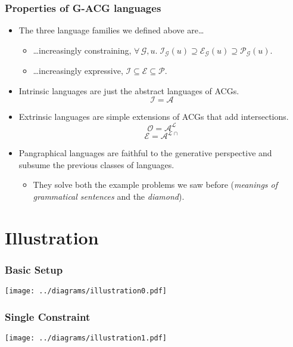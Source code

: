 \documentclass{beamer}
\begin{document}
\begin{frame}
  \frametitle{Properties of G-ACG languages}

  \begin{itemize}
  \item The three language families we defined above are\ldots
    \begin{itemize}
    \item {\ldots}increasingly constraining, $\forall \, \mathcal{G},
      u. \; \mathcal{I}_{\mathcal{G}}(u) \supseteq
      \mathcal{E}_{\mathcal{G}}(u) \supseteq
      \mathcal{P}_{\mathcal{G}}(u)$.
    \item {\ldots}increasingly expressive, $\mathcal{I} \subseteq
      \mathcal{E} \subseteq \mathcal{P}$.
    \end{itemize}
  \vfill
  \item Intrinsic languages are just the abstract languages of ACGs.
    $$\mathcal{I} = \mathcal{A}$$
  \item Extrinsic languages are simple extensions of ACGs that add
    intersections.
    $$\mathcal{O} = \mathcal{A}^{\mathcal{L}}$$
    $$\mathcal{E} = \mathcal{A}^{\mathcal{L}{\cap}}$$
  \vfill
  \item Pangraphical languages are faithful to the generative
    perspective and subsume the previous classes of languages.
    \begin{itemize}
    \item They solve both the example problems we saw before
      (\emph{meanings of grammatical sentences} and the \emph{diamond}).
    \end{itemize}
  \end{itemize}
\end{frame}


\section{Illustration}

\begin{frame}
  \frametitle{Basic Setup}
  \begin{center}
    \texttt{[image: ../diagrams/illustration0.pdf]}
  \end{center}
\end{frame}

\begin{frame}
  \frametitle{Single Constraint}
  \begin{center}
    \texttt{[image: ../diagrams/illustration1.pdf]}
  \end{center}
\end{frame}
\end{document}
